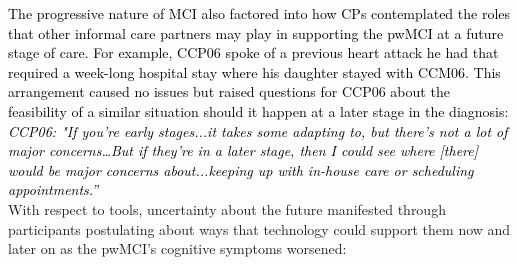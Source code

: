 \documentclass[acmsmall]{acmart}
\begin{document}

\textcolor{black}{The progressive nature of MCI also factored into how CPs contemplated the roles that other informal care partners may play in supporting the pwMCI at a future stage of care. For example, CCP06 spoke of a previous heart attack he had that required a week-long hospital stay where his daughter stayed with CCM06. This arrangement caused no issues but raised questions for CCP06 about the feasibility of a similar situation should it happen at a later stage in the diagnosis:}
\\

\textcolor{black}{\textit{CCP06: "If you’re early stages...it takes some adapting to, but there’s not a lot of major concerns…But if they’re in a later stage, then I could see where [there] would be major concerns about...keeping up with in-house care or scheduling appointments.”}}
\\

With respect to tools, uncertainty about the future manifested through participants postulating about ways that technology could support them now and later on as the pwMCI’s cognitive symptoms worsened:
\\
\end{document}
